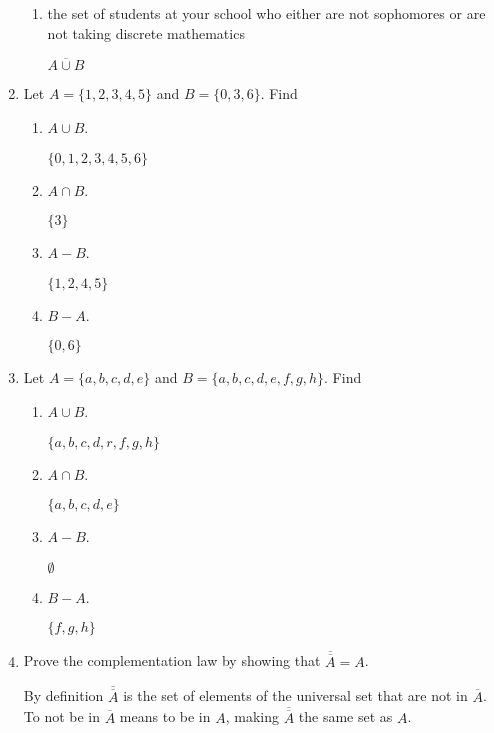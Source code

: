 \documentclass[11pt]{article}
\begin{document}
\begin{enumerate}[label=\textbf{\arabic*.}]
\begin{enumerate}[label=\textbf{\alph*)}]
		\item the set of students at your school who either are not sophomores or are not taking discrete mathematics
		
		$\overline{A \cup B}$
	\end{enumerate}

	\item Let $A = \{1, 2, 3, 4, 5\}$ and $B = \{0, 3, 6\}$. Find
	
	\begin{enumerate}[label=\textbf{\alph*)}]
		\item $A \cup B$.
		
		$\{0, 1, 2, 3, 4, 5, 6\}$
		
		\item $A \cap B$.
		
		$\{3\}$
		
		\item $A - B$.
		
		$\{1, 2, 4, 5\}$
				
		\item $B - A$.
		
		$\{0, 6\}$
	\end{enumerate}

	\item Let $A = \{a, b, c, d, e\}$ and $B = \{a, b, c, d, e, f, g, h\}$. Find
	
	\begin{enumerate}[label=\textbf{\alph*)}]
		\item $A \cup B$.
		
		$\{a, b, c, d, r, f, g, h\}$
		
		\item $A \cap B$.
		
		$\{a, b, c, d, e\}$
		
		\item $A - B$.
		
		$\emptyset$
		
		\item $B - A$.
		
		$\{f, g, h\}$
	\end{enumerate}

	\pagebreak
	\item Prove the complementation law by showing that $\overline{\overline{A}} = A$.
	
	By definition $\overline{\overline{A}}$ is the set of elements of the universal set that are not in $\overline{A}$. To not be in $\overline{A}$ means to be in $A$, making $\overline{\overline{A}}$ the same set as $A$.
	

\end{enumerate}
\end{document}
